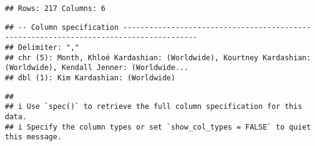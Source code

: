 \documentclass[
]{article}
\begin{document}
\begin{verbatim}
## Rows: 217 Columns: 6
\end{verbatim}

\begin{verbatim}
## -- Column specification ---------------------------------------------------------------------------------------
## Delimiter: ","
## chr (5): Month, Khloé Kardashian: (Worldwide), Kourtney Kardashian: (Worldwide), Kendall Jenner: (Worldwide...
## dbl (1): Kim Kardashian: (Worldwide)
\end{verbatim}

\begin{verbatim}
## 
## i Use `spec()` to retrieve the full column specification for this data.
## i Specify the column types or set `show_col_types = FALSE` to quiet this message.
\end{verbatim}
\end{document}
